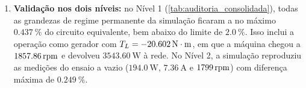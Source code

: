 \begin{enumerate}
    \item \textbf{Validação nos dois níveis:} no Nível 1 (\cref{tab:auditoria_consolidada}), todas as grandezas de regime permanente da simulação ficaram a no máximo $\SI{0,437}{\percent}$ do circuito equivalente, bem abaixo do limite de $\SI{2,0}{\percent}$. Isso inclui a operação como gerador com $T_L = -\SI{20,602}{\mathrm{N\cdot m}}$, em que a máquina chegou a $\SI{1857,86}{\mathrm{rpm}}$ e devolveu $\SI{3543,60}{\watt}$ à rede. No Nível 2, a simulação reproduziu as medições do ensaio a vazio ($\SI{194,0}{\watt}$, $\SI{7,36}{\ampere}$ e $\SI{1799}{\mathrm{rpm}}$) com diferença máxima de $\SI{0,249}{\percent}$.
\end{enumerate}